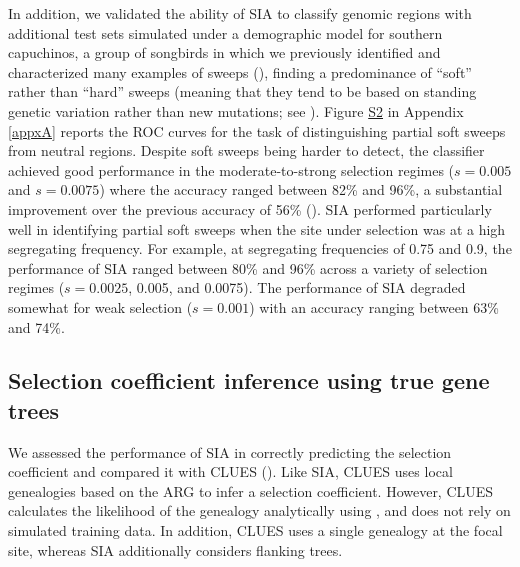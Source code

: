 In addition, we validated the ability of \ac{SIA} to classify genomic regions with additional test sets simulated under a demographic model for southern capuchinos, a group of songbirds in which we previously identified and characterized many examples of sweeps (\cite{hejase_genomic_2020}), finding a predominance of “soft” rather than “hard” sweeps (meaning that they tend to be based on standing genetic variation rather than new mutations; see ). Figure \href{https://academic.oup.com/mbe/article/39/1/msab332/6433161#supplementary-data}{S2} in Appendix \ref{appxA} reports the \ac{ROC} curves for the task of distinguishing partial soft sweeps from neutral regions. Despite soft sweeps being harder to detect, the classifier achieved good performance in the moderate-to-strong selection regimes ($s=0.005$ and $s=0.0075$) where the accuracy ranged between 82\% and 96\%, a substantial improvement over the previous accuracy of 56\% (\cite{hejase_genomic_2020}). \ac{SIA} performed particularly well in identifying partial soft sweeps when the site under selection was at a high segregating frequency. For example, at segregating frequencies of 0.75 and 0.9, the performance of \ac{SIA} ranged between 80\% and 96\% across a variety of selection regimes ($s=0.0025$, 0.005, and 0.0075). The performance of \ac{SIA} degraded somewhat for weak selection ($s=0.001$) with an accuracy ranging between 63\% and 74\%.

\subsection{Selection coefficient inference using true gene trees}
We assessed the performance of \ac{SIA} in correctly predicting the selection coefficient and compared it with CLUES (\cite{stern_approximate_2019}). Like \ac{SIA}, CLUES uses local genealogies based on the \ac{ARG} to infer a selection coefficient. However, CLUES calculates the likelihood of the genealogy analytically using , and does not rely on simulated training data. In addition, CLUES uses a single genealogy at the focal site, whereas \ac{SIA} additionally considers flanking trees.

